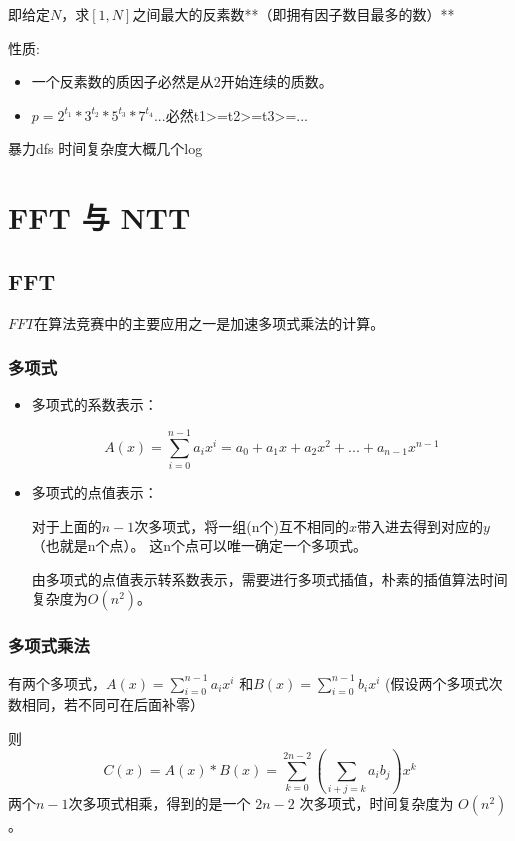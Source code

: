 即给定$N$，求$[1,N]$之间最大的反素数**（即拥有因子数目最多的数）**

性质:
\begin{itemize}
	\item 一个反素数的质因子必然是从2开始连续的质数。 
	\item $p=2^{t_1} * 3^{t_2} * 5^{t_3} * 7^{t_4}$...必然t1>=t2>=t3>=...
\end{itemize}

暴力dfs    时间复杂度大概几个log







\section{FFT 与 NTT}
\subsection{FFT}
$FFT$在算法竞赛中的主要应用之一是加速多项式乘法的计算。

\subsubsection{多项式}
\begin{itemize}
\item 多项式的系数表示：

$$A(x)=\sum_{i=0}^{n-1}a_ix^i=a_0+a_1x+a_2x^2+...+a_{n-1}x^{n-1}$$

\item 多项式的点值表示：

对于上面的$n-1$次多项式，将一组(n个)互不相同的$x$带入进去得到对应的$y$（也就是n个点）。
这{\heiti n个点可以唯一确定一个多项式}。

\begin{note}
由多项式的点值表示转系数表示，需要进行多项式插值，朴素的插值算法时间复杂度为$O(n^2)$。
\end{note}
\end{itemize}

\subsubsection{多项式乘法}
有两个多项式，$A(x)=\sum_{i=0}^{n-1}a_ix^i$ 和$B(x)=\sum_{i=0}^{n-1}b_ix^i$    (假设两个多项式次数相同，若不同可在后面补零）

则
$$
C(x)=A(x)*B(x)=\sum_{k=0}^{2n-2}(\sum_{i+j=k}a_ib_j)x^k
$$
两个$ n - 1$次多项式相乘，得到的是一个 $2n-2$ 次多项式，时间复杂度为 $O(n ^ 2)$。

